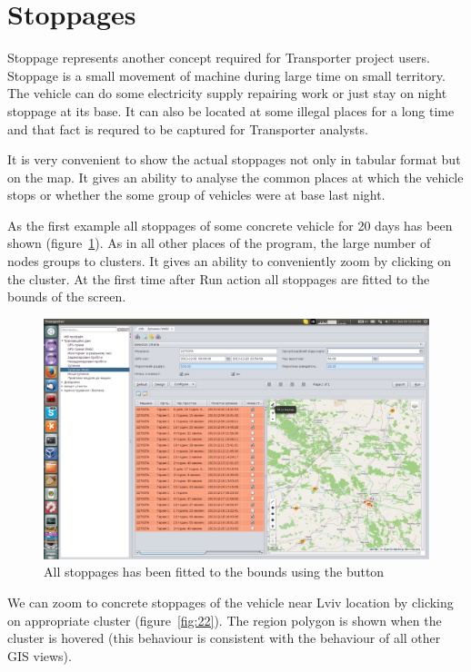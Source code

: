 \section{Stoppages}

Stoppage represents another concept required for Transporter project users. Stoppage is a small movement of machine during large time on small territory. The vehicle can do some electricity supply repairing work or just stay on night stoppage at its base. It can also be located at some illegal places for a long time and that fact is requred to be captured for Transporter analysts.

It is very convenient to show the actual stoppages not only in tabular format but on the map. It gives an ability to analyse the common places at which the vehicle stops or whether the some group of vehicles were at base last night.

As the first example all stoppages of some concrete vehicle for 20 days has been shown (figure~\ref{fig:21}). As in all other places of the program, the large number of nodes groups to clusters. It gives an ability to conveniently zoom by clicking on the cluster. At the first time after Run action all stoppages are fitted to the bounds of the screen.

\begin{figure}[H]
\centering
\includegraphics[width=\linewidth]{chapters/03-stoppages/images/21-all-stoppages-using-fit-to-bounds-button.png}
\caption{All stoppages has been fitted to the bounds using the button}\label{fig:21}
\end{figure}

\newpage
We can zoom to concrete stoppages of the vehicle near Lviv location by clicking on appropriate cluster (figure~\ref{fig:22}). The region polygon is shown when  the cluster is hovered (this behaviour is consistent with the behaviour of all other GIS views).

